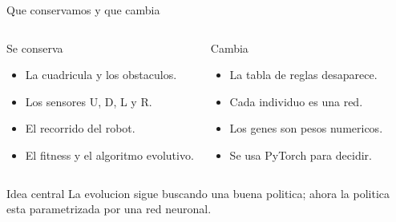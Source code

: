 \documentclass[aspectratio=169,11pt]{beamer}
\begin{document}
\begin{frame}{Que conservamos y que cambia}
  \begin{columns}[T]
      \begin{block}{Se conserva}
        \begin{itemize}
          \item La cuadricula y los obstaculos.
          \item Los sensores U, D, L y R.
          \item El recorrido del robot.
          \item El fitness y el algoritmo evolutivo.
        \end{itemize}
      \end{block}
      \begin{block}{Cambia}
        \begin{itemize}
          \item La tabla de reglas desaparece.
          \item Cada individuo es una red.
          \item Los genes son pesos numericos.
          \item Se usa PyTorch para decidir.
        \end{itemize}
      \end{block}
  \end{columns}
  \vspace{0.25cm}
  \begin{alertblock}{Idea central}
    La evolucion sigue buscando una buena politica; ahora la politica esta parametrizada por una red neuronal.
  \end{alertblock}
\end{frame}
\end{document}
